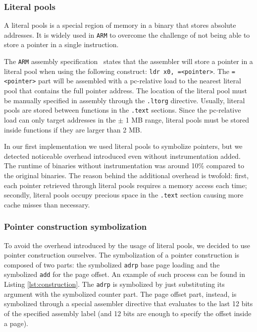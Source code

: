 \documentclass[a4paper,11pt,oneside]{report}
\begin{document}
\subsubsection{Literal pools}

A literal pools is a special region of memory in a binary that stores absolute
addresses. It is widely used in \texttt{ARM} to overcome the challenge of not
being able to store a pointer in a single instruction. 

The \texttt{ARM} assembly specification~\cite{literalpoolsarm} states that the
assembler will store a pointer in a literal pool when using the following
construct: \texttt{ldr x0, =<pointer>}.  The \texttt{=<pointer>} part will be
assembled with a pc-relative load to the nearest literal pool that contains the
full pointer address.  The location of the literal pool must be manually
specified in assembly through the \texttt{.ltorg} directive. Usually, literal
pools are stored between functions in the \texttt{.text} sections. Since the
pc-relative load can only target addresses in the $\pm$ 1 MB range, literal
pools must be stored inside functions if they are larger than 2 MB. 

In our first implementation we used literal pools to symbolize pointers, but we 
detected noticeable overhead introduced even without instrumentation added. The runtime
of binaries without instrumentation was around 10\% compared to the original binaries. 
The reason behind the additional overhead is twofold: first, each pointer retrieved through
literal pools requires a memory access each time; secondly, literal pools occupy precious
space in the \texttt{.text} section causing more cache misses than necessary. 


\subsubsection{Pointer construction symbolization}

To avoid the overhead introduced by the usage of literal pools, we decided to
use pointer construction ourselves. The symbolization of a pointer construction
is composed of two parts: the symbolized \texttt{adrp} base page loading and
the symbolized \texttt{add} for the page offset. An example of such process can
be found in Listing \ref{lst:construction}. The \texttt{adrp} is symbolized by just
substituting its argument with the symbolized counter part.  The page offset part,
instead, is symbolized through a special assembler directive that evaluates to the
last 12 bits of the specified assembly label (and 12 bits are enough to specify
the offset inside a page). 
\end{document}
